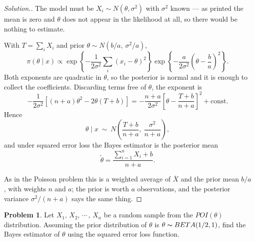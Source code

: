 \documentclass[12pt,a4paper]{report}
\theoremstyle{definition}
\newtheorem{problemx}{Problem}[section]
\newenvironment{problem}{\begin{problemx}}{\end{problemx}}
\newenvironment{solution}
  {\renewcommand{\qedsymbol}{}\begin{proof}[\textit{Solution}.]}
  {\end{proof}}
\begin{document}
\begin{solution}
The model must be $X_i \sim N\left(\theta,\sigma^{2}\right)$ with $\sigma^{2}$
known --- as printed the mean is zero and $\theta$ does not appear in the
likelihood at all, so there would be nothing to estimate.

With $T=\sum_i X_i$ and prior $\theta\sim N\left(b/a,\ \sigma^{2}/a\right)$,
\[\pi\left(\theta\mid x\right)
\propto \exp\left\{-\frac{1}{2\sigma^{2}}\sum_i\left(x_i-\theta\right)^{2}\right\}
\exp\left\{-\frac{a}{2\sigma^{2}}\left(\theta-\frac{b}{a}\right)^{2}\right\}.\]
Both exponents are quadratic in $\theta$, so the posterior is normal and it is
enough to collect the coefficients. Discarding terms free of $\theta$, the
exponent is
\[-\frac{1}{2\sigma^{2}}\left[(n+a)\theta^{2} - 2\theta\left(T+b\right)\right]
= -\frac{n+a}{2\sigma^{2}}\left[\theta - \frac{T+b}{n+a}\right]^{2} + \text{const} .\]
Hence
\[\theta \mid x \ \sim\ N\!\left(\frac{T+b}{n+a},\ \frac{\sigma^{2}}{n+a}\right),\]
and under squared error loss the Bayes estimator is the posterior mean
\[\widetilde{\theta} = \frac{\sum_{i=1}^{n}X_i + b}{n+a} .\]

As in the Poisson problem this is a weighted average of $\overline{X}$ and the
prior mean $b/a$, with weights $n$ and $a$; the prior is worth $a$ observations,
and the posterior variance $\sigma^{2}/(n+a)$ says the same thing.
\end{solution}

\begin{problem}
Let  $X_1, \, X_2, \, \cdots\, , \, X_n$ be a random sample from the $POI(\theta)$ distribution. Assuming the prior distribution of $\theta$ is $\theta \thicksim BETA(1/2,1)$, find the Bayes estimator of $\theta$ using the squared error loss function.
\end{problem}
\end{document}

